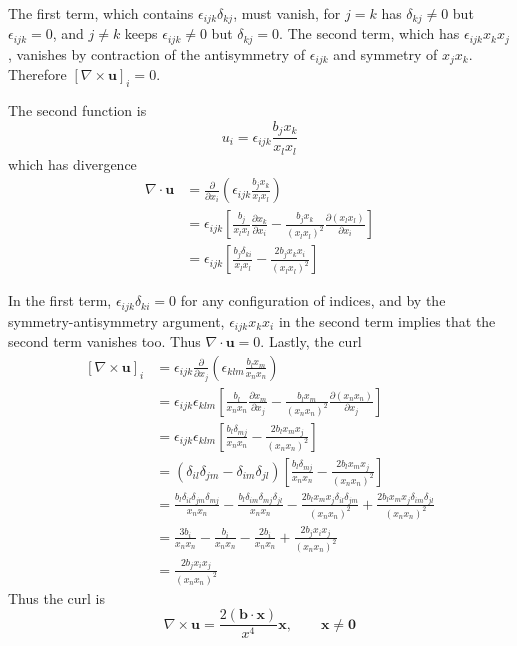 \documentclass[a4paper]{article}
\begin{document}
The first term, which contains \( \epsilon_{ijk}\delta_{kj} \), must vanish, for \( j = k \) has \( \delta_{kj} \neq 0 \) but \( \epsilon_{ijk} = 0 \), and \( j \neq k \) keeps \( \epsilon_{ijk} \neq 0 \) but \( \delta_{kj} = 0 \). The second term, which has \( \epsilon_{ijk}x_{k}x_{j} \), vanishes by contraction of the antisymmetry of \( \epsilon_{ijk} \) and symmetry of \( x_{j}x_{k} \). Therefore \( \!\left[ \nabla \times \pmb{u} \right]_{i} = 0 \).

The second function is
\[
	u_{i} = \epsilon_{ijk}\frac{b_{j}x_{k}}{x_{l}x_{l}} 
\]
which has divergence
\begin{align*}
	\nabla \cdot \pmb{u} & = \frac{\partial }{\partial x_{i}}\!\left( \epsilon_{ijk}\frac{b_{j}x_{k}}{x_{l}x_{l}} \right) \\
	 & = \epsilon_{ijk}\!\left[ \frac{b_{j}}{x_{l}x_{l}}\frac{\partial x_{k}}{\partial x_{i}} - \frac{b_{j}x_{k}}{\!\left( x_{l}x_{l} \right)^{2}}\frac{\partial \!\left( x_{l}x_{l} \right)}{\partial x_{i}} \right] \\ 
	 & = \epsilon_{ijk}\!\left[ \frac{b_{j}\delta_{ki}}{x_{l}x_{l}} - \frac{2b_{j}x_{k}x_{i}}{\!\left( x_{l}x_{l} \right)^{2}} \right]
\end{align*}

In the first term, \( \epsilon_{ijk}\delta_{ki} = 0 \) for any configuration of indices, and by the symmetry-antisymmetry argument, \( \epsilon_{ijk}x_{k}x_{i} \) in the second term implies that the second term vanishes too. Thus \( \nabla \cdot \pmb{u} = 0 \). Lastly, the curl
\begin{align*}
	\!\left[ \nabla \times \pmb{u} \right]_{i} & = \epsilon_{ijk}\frac{\partial }{\partial x_{j}}\!\left( \epsilon_{klm}\frac{b_{l}x_{m}}{x_{n}x_{n}} \right) \\
	 & = \epsilon_{ijk}\epsilon_{klm}\!\left[ \frac{b_{l}}{x_{n}x_{n}}\frac{\partial x_{m}}{\partial x_{j}} - \frac{b_{l}x_{m}}{\!\left( x_{n}x_{n} \right)^{2}}\frac{\partial \!\left( x_{n}x_{n} \right)}{\partial x_{j}} \right] \\ 
	 & = \epsilon_{ijk}\epsilon_{klm}\!\left[ \frac{b_{l}\delta_{mj}}{x_{n}x_{n}} - \frac{2b_{l}x_{m}x_{j}}{\!\left( x_{n}x_{n} \right)^{2}} \right] \\
	 & = \!\left( \delta_{il}\delta_{jm} - \delta_{im}\delta_{jl} \right)\!\left[ \frac{b_{l}\delta_{mj}}{x_{n}x_{n}} - \frac{2b_{l}x_{m}x_{j}}{\!\left( x_{n}x_{n} \right)^{2}} \right] \\
	 & = \frac{b_{l}\delta_{il}\delta_{jm}\delta_{mj}}{x_{n}x_{n}} - \frac{b_{l}\delta_{im}\delta_{mj}\delta_{jl}}{x_{n}x_{n}} - \frac{2b_{l}x_{m}x_{j}\delta_{il}\delta_{jm}}{\!\left( x_{n}x_{n} \right)^{2}} + \frac{2b_{l}x_{m}x_{j}\delta_{im}\delta_{jl}}{\!\left( x_{n}x_{n} \right)^{2}} \\
	 & = \frac{3b_{i}}{x_{n}x_{n}} - \frac{b_{i}}{x_{n}x_{n}} - \frac{2b_{i}}{x_{n}x_{n}} + \frac{2b_{j}x_{i}x_{j}}{\!\left( x_{n}x_{n} \right)^{2}} \\
	 & = \frac{2b_{j}x_{i}x_{j}}{\!\left( x_{n}x_{n} \right)^{2}}
\end{align*}
Thus the curl is 
\[
	\nabla \times \pmb{u} = \frac{2 \!\left( \pmb{b} \cdot \pmb{x} \right)}{x^{4}} \pmb{x}, \qquad \pmb{x} \neq \pmb{0}
\]
\end{document}
